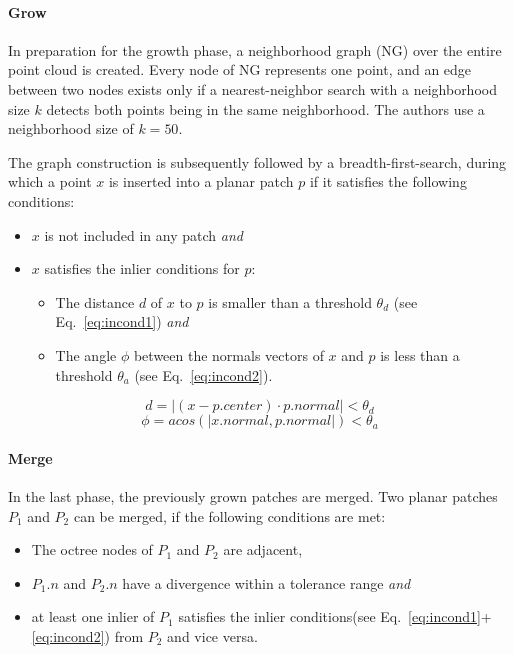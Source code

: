 \documentclass[main.tex]{subfiles}
\begin{document}
\paragraph{Grow}
In preparation for the growth phase, a neighborhood graph (NG) over the entire point cloud is created. 
Every node of NG represents one point, and an edge between two nodes exists only if
a nearest-neighbor search with a neighborhood size $k$ detects both points being in the same neighborhood. 
The authors use a neighborhood size of $k=50$.


The graph construction is subsequently followed by a breadth-first-search, during which a point $x$ is inserted into a planar patch $p$ if it satisfies the following conditions:
\begin{itemize}
    \item $x$ is not included in any patch \textit{and}
    \item $x$ satisfies the inlier conditions for $p$: %
          \begin{itemize}
              \item The distance $d$ of $x$ to $p$ is smaller than a threshold $\theta_d$ (see Eq.~\ref{eq:incond1}) \textit{and} %
              \item The angle $\phi$ between the normals vectors of $x$ and $p$ is less than a threshold $\theta_a$ (see Eq.~\ref{eq:incond2}). %
          \end{itemize}
\end{itemize}

\begin{equation}
    \label{eq:incond1}
    d = |(x - p.center)\cdot p.normal| < \theta_d
\end{equation}
\begin{equation}
    \label{eq:incond2}
    \phi = acos(|x.normal, p.normal|) < \theta_a
\end{equation}

\paragraph*{Merge}
In the last phase, the previously grown patches are merged. Two planar patches $P_1$ and $P_2$ can be merged, if the following conditions are met:
\begin{itemize}
    \item The octree nodes of $P_1$ and $P_2$ are adjacent,
    \item $P_1.n$ and $P_2.n$ have a divergence within a tolerance range \textit{and}
    \item at least one inlier of $P_1$ satisfies the inlier conditions(see Eq.~\ref{eq:incond1}+\ref{eq:incond2}) from $P_2$ and vice versa.
\end{itemize}
\end{document}
